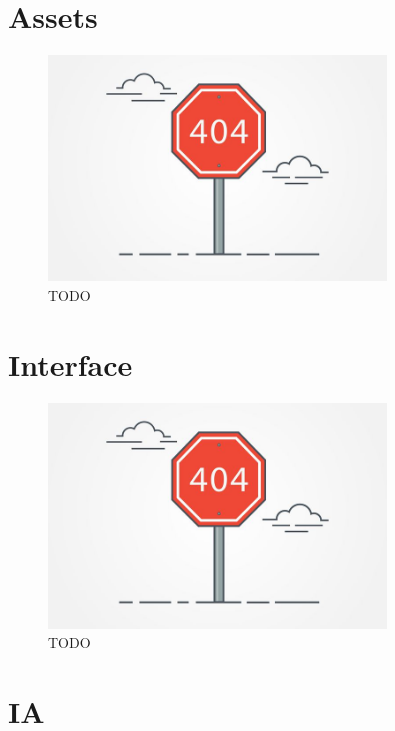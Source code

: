 \documentclass[12pt]{report}
\begin{document}
\section*{Assets}

\begin{figure}[H]
    \centering
    \includegraphics[width=0.8\textwidth]{404}
    \caption{TODO}
\end{figure}

\section*{Interface}

\begin{figure}[H]
    \centering
    \includegraphics[width=0.8\textwidth]{404}
    \caption{TODO}
\end{figure}

\section*{IA}
\end{document}
